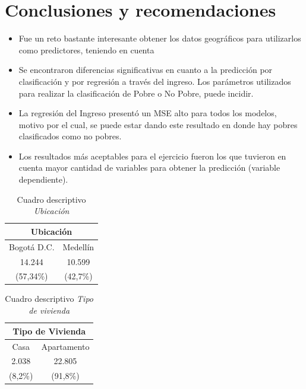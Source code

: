 \documentclass[conference, 10pt]{IEEEtran}
\begin{document}
\section{Conclusiones y recomendaciones}
\begin{itemize}
\item Fue un reto bastante interesante obtener los datos geográficos para utilizarlos como predictores, teniendo en cuenta 
\item Se encontraron diferencias significativas en cuanto a la predicción por clasificación y por regresión a través del ingreso. Los parámetros utilizados para realizar la clasificación de Pobre o No Pobre, puede incidir.
\item La regresión del Ingreso presentó un MSE alto para todos los modelos, motivo por el cual, se puede estar dando este resultado en donde hay pobres clasificados como no pobres.
\item Los resultados más aceptables para el ejercicio fueron los que tuvieron en cuenta mayor cantidad de variables para obtener la predicción (variable dependiente).
\end{itemize}




\begin{table}[htbp]
\caption{Cuadro descriptivo \textit{Ubicación}}
\begin{center}
\begin{tabular}{|c|c|}
\hline
\multicolumn{2}{|c|}{\textbf{Ubicación}} \\
\cline{1-2} 
\hline
 Bogotá D.C.&Medellín\\
 14.244&10.599\\
 (57,34\%)&(42,7\%)\\
 
	\hline
\end{tabular}
\label{tab_1}
\end{center}
\end{table}

\begin{table}[htbp]
\caption{Cuadro descriptivo \textit{Tipo de vivienda}}
\begin{center}
\begin{tabular}{|c|c|}
\hline
\multicolumn{2}{|c|}{\textbf{Tipo de Vivienda}} \\
\cline{1-2} 
\hline
 Casa&Apartamento\\
 2.038&22.805\\
 (8,2\%)&(91,8\%)\\
 
	\hline
\end{tabular}
\label{tab_2}
\end{center}
\end{table}
\end{document}

